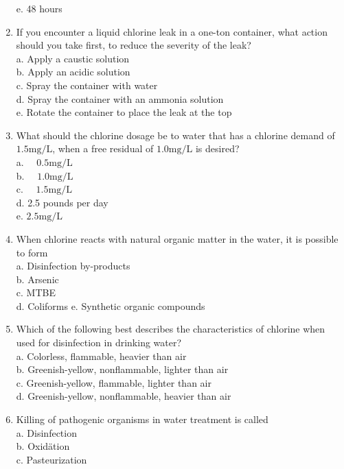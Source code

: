 \begin{enumerate}[1.]
e. 48 hours\\
\item If you encounter a liquid chlorine leak in a one-ton container, what action should you take first, to reduce the severity of the leak?\\
a. Apply a caustic solution\\
b. Apply an acidic solution\\
c. Spray the container with water\\
d. Spray the container with an ammonia solution\\
e. Rotate the container to place the leak at the top\\
\item What should the chlorine dosage be to water that has a chlorine demand of $1.5 \mathrm{mg} / \mathrm{L}$, when a free residual of $1.0 \mathrm{mg} / \mathrm{L}$ is desired?\\
a. $\quad 0.5 \mathrm{mg} / \mathrm{L}$\\
b. $\quad 1.0 \mathrm{mg} / \mathrm{L}$\\
c. $\quad 1.5 \mathrm{mg} / \mathrm{L}$\\
d. 2.5 pounds per day\\
e. $2.5 \mathrm{mg} / \mathrm{L}$\\
\item When chlorine reacts with natural organic matter in the water, it is possible to form\\
a. Disinfection by-products\\
b. Arsenic\\
c. MTBE\\
d. Coliforms e. Synthetic organic compounds\\
\item Which of the following best describes the characteristics of chlorine when used for disinfection in drinking water?\\
a. Colorless, flammable, heavier than air\\
b. Greenish-yellow, nonflammable, lighter than air\\
c. Greenish-yellow, flammable, lighter than air\\
d. Greenish-yellow, nonflammable, heavier than air\\
\item Killing of pathogenic organisms in water treatment is called\\
a. Disinfection\\
b. Oxidätion\\
c. Pasteurization\\

\end{enumerate}
